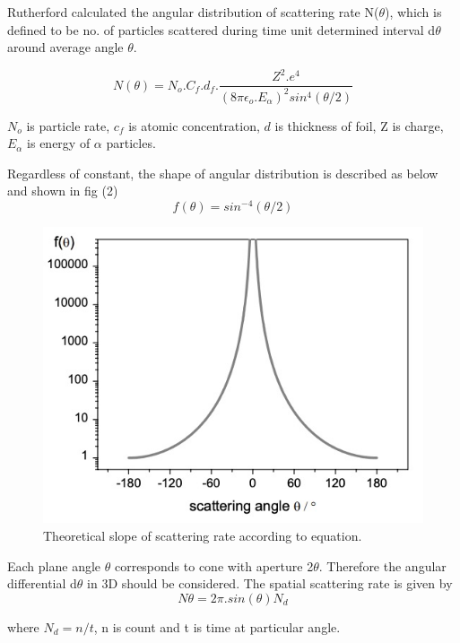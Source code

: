 \documentclass[a4paper, amsfonts, amssymb, amsmath, reprint, showkeys, nofootinbib, twoside]{revtex4-1}
\begin{document}
Rutherford calculated the angular distribution of scattering rate N($\theta$), which is defined to be no. of particles scattered during time unit determined interval d$\theta$ around average angle $\theta$.

\begin{equation}
	N(\theta)=N_o.C_f.d_f.\frac{Z^2.e^4}{(8\pi\epsilon_o.E_\alpha)^2 sin^4(\theta/2)}
\end{equation}

$N_o$ is particle rate, $c_f$ is atomic concentration, $d $ is thickness of foil, Z is charge, $E_\alpha$ is energy of $\alpha$ particles.

Regardless of constant, the shape of angular distribution is described as below and shown in fig (2)
\begin{equation}
	f(\theta)=sin^{-4}(\theta/2)
\end{equation} 

\begin{figure}[H]
	\centering
	\includegraphics[scale=0.4]{2}
	\caption{Theoretical slope of scattering rate according to equation.}
\end{figure}

Each plane angle $\theta$ corresponds to cone with aperture 2$\theta$. Therefore the angular differential d$\theta$ in 3D should be considered. The spatial scattering rate is given by 
\begin{equation}
	N{\theta}=2\pi. sin(\theta) N_d
\end{equation}

where $N_d=n/t$, n is count and t is time at particular angle.
\end{document}
